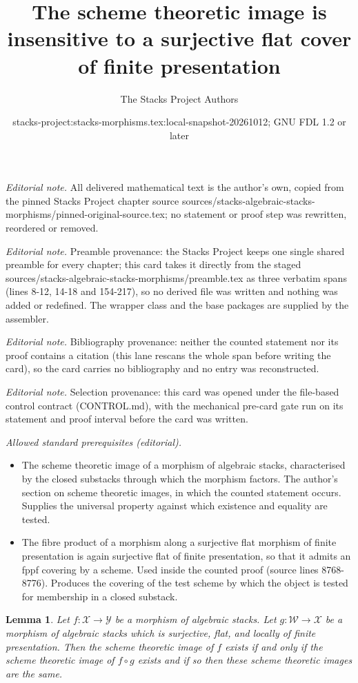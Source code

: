 \documentclass[10pt,a4paper]{amsart}
\title{The scheme theoretic image is insensitive to a surjective flat cover of finite presentation}
\author{The Stacks Project Authors}
\date{stacks-project:stacks-morphisms.tex:local-snapshot-20261012; GNU FDL 1.2 or later}
\theoremstyle{plain}
\newtheorem{lemma}[subsection]{Lemma}
\theoremstyle{definition}
\theoremstyle{remark}
\numberwithin{equation}{subsection}
\begin{document}
\maketitle
\noindent\textit{Editorial note.} All delivered mathematical text is the author's own, copied from the pinned Stacks Project chapter source sources/stacks-algebraic-stacks-morphisms/pinned-original-source.tex; no statement or proof step was rewritten, reordered or removed.\par\medskip
\noindent\textit{Editorial note.} Preamble provenance: the Stacks Project keeps one single shared preamble for every chapter; this card takes it directly from the staged sources/stacks-algebraic-stacks-morphisms/preamble.tex as three verbatim spans (lines 8-12, 14-18 and 154-217), so no derived file was written and nothing was added or redefined. The wrapper class and the base packages are supplied by the assembler.\par\medskip
\noindent\textit{Editorial note.} Bibliography provenance: neither the counted statement nor its proof contains a citation (this lane rescans the whole span before writing the card), so the card carries no bibliography and no entry was reconstructed.\par\medskip
\noindent\textit{Editorial note.} Selection provenance: this card was opened under the file-based control contract (CONTROL.md), with the mechanical pre-card gate run on its statement and proof interval before the card was written.\par\medskip
\noindent\textit{Allowed standard prerequisites (editorial).}\begin{itemize}
\item The scheme theoretic image of a morphism of algebraic stacks, characterised by the closed substacks through which the morphism factors. The author's section on scheme theoretic images, in which the counted statement occurs. Supplies the universal property against which existence and equality are tested.
\item The fibre product of a morphism along a surjective flat morphism of finite presentation is again surjective flat of finite presentation, so that it admits an fppf covering by a scheme. Used inside the counted proof (source lines 8768-8776). Produces the covering of the test scheme by which the object is tested for membership in a closed substack.
\end{itemize}\medskip
\begin{lemma}
\label{lemma-cover-upstairs}
Let $f : \mathcal{X} \to \mathcal{Y}$ be a morphism of algebraic stacks.
Let $g : \mathcal{W} \to \mathcal{X}$ be a morphism of algebraic stacks
which is surjective, flat, and locally of finite presentation.
Then the scheme theoretic image of $f$ exists if and only if the
scheme theoretic image of $f \circ g$ exists and if so then these
scheme theoretic images are the same.
\end{lemma}
\end{document}
